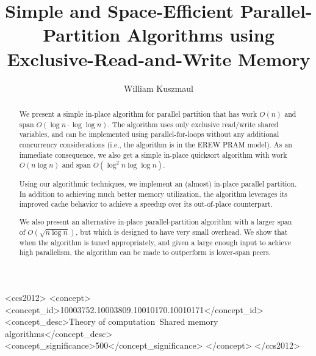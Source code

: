 \documentclass[sigconf]{acmart}
\theoremstyle{remark}
\theoremstyle{remark}
\begin{document}
\title{Simple and Space-Efficient Parallel-Partition Algorithms using Exclusive-Read-and-Write Memory}
\subtitle{}

\author{William Kuszmaul}


\renewcommand{\shortauthors}{William Kuszmaul}


\begin{abstract}
We present a simple in-place algorithm for parallel partition that has
work $O(n)$ and span $O(\log n \cdot \log \log n)$. The algorithm uses
only exclusive read/write shared variables, and can be implemented
using parallel-for-loops without any additional concurrency
considerations (i.e., the algorithm is in the EREW PRAM model). As an
immediate consequence, we also get a simple in-place quicksort
algorithm with work $O(n \log n)$ and span $O(\log^2 n \log \log n)$.

Using our algorithmic techniques, we implement an (almost) in-place
parallel partition. In addition to achieving much better memory
utilization, the algorithm leverages its improved cache behavior to
achieve a speedup over its out-of-place counterpart.

We also present an alternative in-place parallel-partition algorithm
with a larger span of $O(\sqrt{n \log n})$, but which is designed to
have very small overhead. We show that when the algorithm
is tuned appropriately, and given a large enough input to achieve high
parallelism, the algorithm can be made to outperform is lower-span
peers.


\end{abstract}

%
%
\begin{CCSXML}
<ccs2012>
<concept>
<concept_id>10003752.10003809.10010170.10010171</concept_id>
<concept_desc>Theory of computation~Shared memory algorithms</concept_desc>
<concept_significance>500</concept_significance>
</concept>
</ccs2012>
\end{CCSXML}


\end{document}
